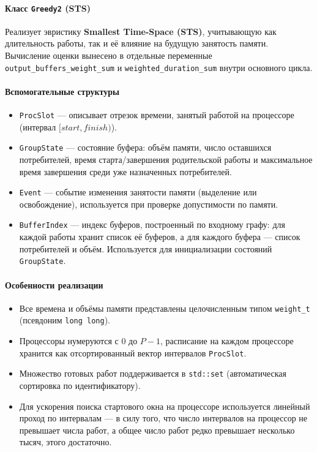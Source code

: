 \paragraph{Класс \texttt{Greedy2} (STS)}
Реализует эвристику \textbf{Smallest Time-Space (STS)}, учитывающую как длительность работы, так и её влияние на будущую занятость памяти. Вычисление оценки вынесено в отдельные переменные \texttt{output\_buffers\_weight\_sum} и \texttt{weighted\_duration\_sum} внутри основного цикла.

\paragraph{Вспомогательные структуры}
\begin{itemize}
	\item \texttt{ProcSlot} — описывает отрезок времени, занятый работой на процессоре (интервал $[start, finish)$).
	\item \texttt{GroupState} — состояние буфера: объём памяти, число оставшихся потребителей, время старта/завершения родительской работы и максимальное время завершения среди уже назначенных потребителей.
	\item \texttt{Event} — событие изменения занятости памяти (выделение или освобождение), используется при проверке допустимости по памяти.
	\item \texttt{BufferIndex} — индекс буферов, построенный по входному графу: для каждой работы хранит список её буферов, а для каждого буфера — список потребителей и объём. Используется для инициализации состояний \texttt{GroupState}.\\
\end{itemize}

\paragraph{Особенности реализации}
\begin{itemize}
	\item Все времена и объёмы памяти представлены целочисленным типом \texttt{weight\_t} (псевдоним \texttt{long long}).
	\item Процессоры нумеруются с 0 до $P-1$, расписание на каждом процессоре хранится как отсортированный вектор интервалов \texttt{ProcSlot}.
	\item Множество готовых работ поддерживается в \texttt{std::set} (автоматическая сортировка по идентификатору).
	\item Для ускорения поиска стартового окна на процессоре используется линейный проход по интервалам — в силу того, что число интервалов на процессор не превышает числа работ, а общее число работ редко превышает несколько тысяч, этого достаточно.
\end{itemize}

